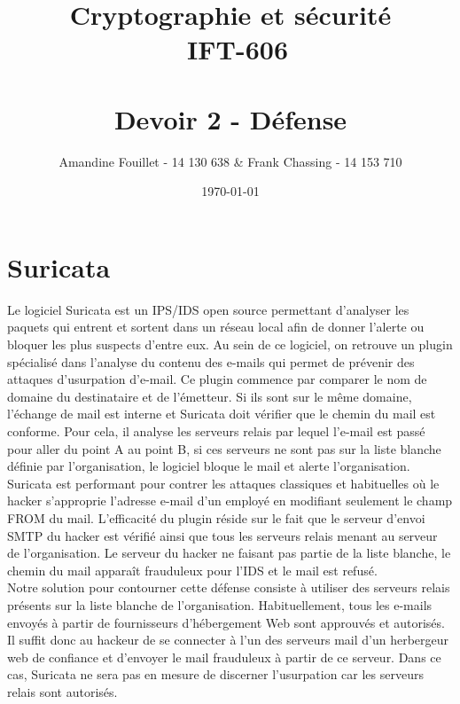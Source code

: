 \documentclass[11pt]{article}
\title{Cryptographie et sécurité \\ ~\textbf{IFT-606} \\~\\ Devoir 2 - Défense}
\author{Amandine Fouillet - 14 130 638 \& Frank Chassing - 14 153 710}
\date{\today}
\begin{document}
\maketitle
\section*{Suricata}
Le logiciel Suricata est un IPS/IDS open source permettant d’analyser les paquets qui entrent et sortent dans un réseau local afin de donner l’alerte ou bloquer les plus suspects d’entre eux. Au sein de ce logiciel, on retrouve un plugin spécialisé dans l’analyse du contenu des e-mails qui permet de prévenir des attaques d’usurpation d’e-mail. Ce plugin commence par comparer le nom de domaine du destinataire et de l’émetteur. Si ils sont sur le même domaine, l’échange de mail est interne et Suricata doit vérifier que le chemin du mail est conforme. Pour cela, il analyse les serveurs relais par lequel l’e-mail est passé pour aller du point A au point B, si ces serveurs ne sont pas sur la liste blanche définie par l’organisation, le logiciel bloque le mail et alerte l’organisation. ~\\

Suricata est performant pour contrer les attaques classiques et habituelles où le hacker s’approprie l’adresse e-mail d’un employé en modifiant seulement le champ FROM du mail. L’efficacité du plugin réside sur le fait que le serveur d’envoi SMTP du hacker est vérifié ainsi que tous les serveurs relais menant au serveur de l’organisation. Le serveur du hacker ne faisant pas partie de la liste blanche, le chemin du mail apparaît frauduleux pour l’IDS et le mail est refusé. ~\\

Notre solution pour contourner cette défense consiste à utiliser des serveurs relais présents sur la liste blanche de l’organisation. Habituellement, tous les e-mails envoyés à partir de fournisseurs d'hébergement Web sont approuvés et autorisés. Il suffit donc au hackeur de se connecter à l’un des serveurs mail d’un herbergeur web de confiance et d’envoyer le mail frauduleux à partir de ce serveur. Dans ce cas, Suricata ne sera pas en mesure de discerner l’usurpation car les serveurs relais sont autorisés.
\end{document}
